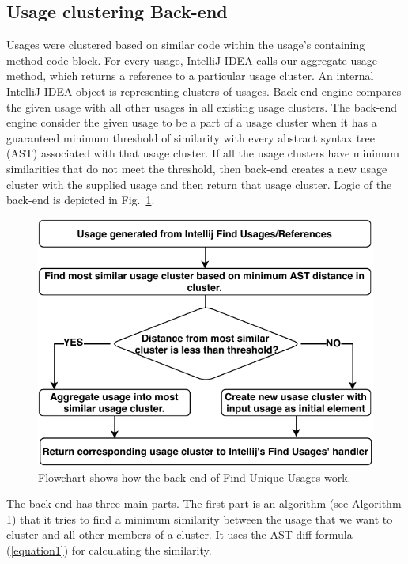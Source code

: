\documentclass[conference]{IEEEtran}
\begin{document}
\subsection{Usage clustering Back-end} 
Usages were clustered based on similar code within the usage's containing method code block. For every usage, IntelliJ IDEA calls our aggregate usage method, which returns a reference to a particular usage cluster. An internal IntelliJ IDEA object is representing clusters of usages. Back-end engine compares the given usage with all other usages in all existing usage clusters. The back-end engine consider the given usage to be a part of a usage cluster when it has a guaranteed minimum threshold of similarity with every abstract syntax tree (AST)  associated with that usage cluster. If all the usage clusters have minimum similarities that do not meet the threshold, then back-end creates a new usage cluster with the supplied usage and then return that usage cluster. Logic of the back-end is depicted in Fig.~\ref{fig:flowchart}. \par
\begin{figure}
    \centering
    \includegraphics [width=\columnwidth,keepaspectratio, clip]{figures/flowchart2}
    \caption{Flowchart shows how the back-end of Find Unique Usages work. }
\label{fig:flowchart}
\end{figure}

The back-end has three main parts. The first part is an algorithm (see Algorithm 1) that it tries to find a minimum similarity between the usage that we want to cluster and all other members of a cluster. It uses the AST diff formula (\ref{equation1}) for calculating the similarity.\par
\end{document}
